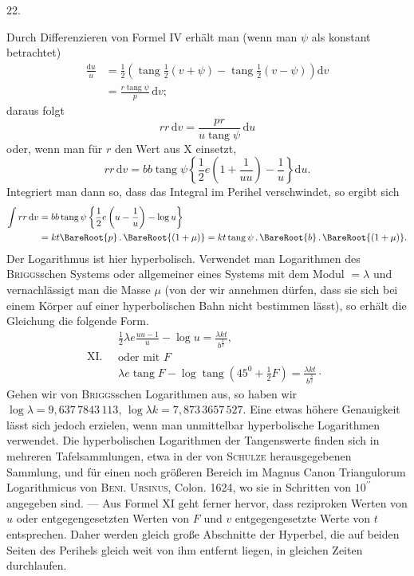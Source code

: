 \par{}
\begin{center}
22.
\end{center}
Durch Differenzieren von Formel IV erhält man (wenn man $\psi$ als konstant betrachtet)
\[
\begin{aligned}
\frac{\mathrm{d}u}{u}&=\frac{1}{2}\left(\operatorname{tang}\frac{1}{2}(v+\psi)-\operatorname{tang}\frac{1}{2}(v-\psi)\right)\mathrm{d}v\\
&=\frac{r\operatorname{tang}\psi}{p}\,\mathrm{d}v;
\end{aligned}
\]
daraus folgt
\[
r r\,\mathrm{d}v=\frac{p r}{u\operatorname{tang}\psi}\,\mathrm{d}u
\]
oder, wenn man für $r$ den Wert aus X einsetzt,
\[
r r\,\mathrm{d}v=b b\operatorname{tang}\psi\left\{\frac{1}{2}e\left(1+\frac{1}{u u}\right)-\frac{1}{u}\right\}\mathrm{d}u.
\]
Integriert man dann so, dass das Integral im Perihel verschwindet, so ergibt sich
\[
\begin{aligned}
\int r r\,\mathrm{d}v&=b b\operatorname{tang}\psi\left\{\frac{1}{2}e\left(u-\frac{1}{u}\right)-\log u\right\}\\
&=k t\BareRoot{p}\, .\,\BareRoot{(1+\mu)}=k t\operatorname{tang}\psi\, .\,\BareRoot{b}\, .\,\BareRoot{(1+\mu)}.
\end{aligned}
\]
Der Logarithmus ist hier hyperbolisch. Verwendet man Logarithmen des \textsc{Briggs}schen Systems oder allgemeiner eines Systems mit dem Modul $=\lambda$ und vernachlässigt man die Masse $\mu$ (von der wir annehmen dürfen, dass sie sich bei einem Körper auf einer hyperbolischen Bahn nicht bestimmen lässt), so erhält die Gleichung die folgende Form.
\[
\mathrm{XI.}\quad\begin{gathered}
\frac{1}{2}\lambda e\frac{u u-1}{u}-\log u=\frac{\lambda k t}{b^{\frac{3}{2}}},\\
\text{oder mit }F\\
\lambda e\operatorname{tang}F-\log\operatorname{tang}(45^0+\frac{1}{2}F)=\frac{\lambda k t}{b^{\frac{3}{2}}}\cdot
\end{gathered}
\]
Gehen wir von \textsc{Briggs}schen Logarithmen aus, so haben wir \\
$\log\lambda=9{,}637\,7843\,113$, $\log\lambda k=7{,}873\,3657\,527$. Eine etwas höhere Genauigkeit lässt sich jedoch erzielen, wenn man unmittelbar hyperbolische Logarithmen verwendet. Die hyperbolischen Logarithmen der Tangenswerte finden sich in mehreren Tafelsammlungen, etwa in der von \textsc{Schulze} herausgegebenen Sammlung, und für einen noch größeren Bereich im Magnus Canon Triangulorum Logarithmicus von \textsc{Beni. Ursinus}, Colon. 1624, wo sie in Schritten von $10^{\prime\prime}$ angegeben sind. — Aus Formel XI geht ferner hervor, dass reziproken Werten von $u$ oder entgegengesetzten Werten von $F$ und $v$ entgegengesetzte Werte von $t$ entsprechen. Daher werden gleich große Abschnitte der Hyperbel, die auf beiden Seiten des Perihels gleich weit von ihm entfernt liegen, in gleichen Zeiten durchlaufen.
